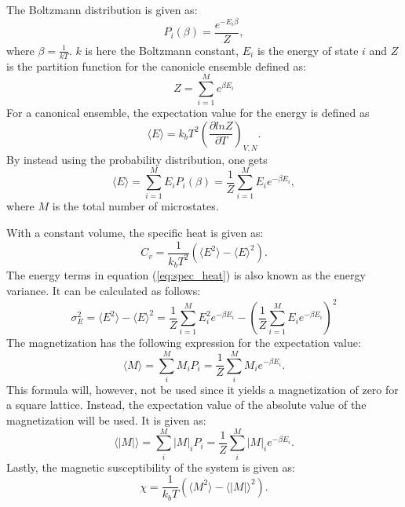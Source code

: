 \documentclass[10pt,a4paper,titlepage]{article}
\begin{document}
The Boltzmann distribution is given as: 
\begin{equation}
P_i(\beta)=\frac{e^{-E_i\beta}}{Z},
\end{equation}
where $\beta = \frac{1}{kT}$. $k$ is here the Boltzmann constant, $E_i$ is the energy of state $i$ and $Z$ is the partition function for the canonicle ensemble defined as:
\begin{equation}
\label{eq:partition}
Z = \sum_{i=1}^{M}e^{\beta E_{i}}
\end{equation}
For a canonical ensemble, the expectation value for the energy is defined as
\begin{equation}
\langle E\rangle=k_{b}T^2\left(\frac{\partial lnZ}{\partial T}\right)_{V,N}.
\end{equation}
By instead using the probability distribution, one gets
\begin{equation}
\langle E\rangle=\sum_{i=1}^{M}E_{i}P_{i}(\beta)=\frac{1}{Z}\sum_{i=1}^{M}E_{i}e^{-\beta E_{i}},
\end{equation}
where $M$ is the total number of microstates. 

With a constant volume, the specific heat is given as:
\begin{equation}
\label{eq:spec_heat}
C_{v}=\frac{1}{k_{b}T^{2}}\left(\langle E^2\rangle - \langle E\rangle^2\right).
\end{equation}
The energy terms in equation (\ref{eq:spec_heat}) is also known as the energy variance. It can be calculated as follows:
\begin{equation}
\label{eq:e_var}
\sigma^2_E = \langle E^2\rangle - \langle E\rangle^2 = \frac{1}{Z}\sum_{i=1}^{M}E_i^2e^{-\beta E_i}-\left(\frac{1}{Z}\sum_{i=1}^{M}E_ie^{-\beta E_i}\right)^{2}
\end{equation}
The magnetization has the following expression for the expectation value:
\begin{equation}
\langle M\rangle = \sum_i^{M}M_{i}P_{i}=\frac{1}{Z}\sum_i^{M}M_{i}e^{-\beta E_i}.
\end{equation}
This formula will, however, not be used since it yields a magnetization of zero for a square lattice. Instead, the expectation value of the absolute value of the magnetization will be used. It is given as:
\begin{equation}
\label{eq:magn}
\langle |M|\rangle = \sum_i^{M}|M|_{i}P_{i}=\frac{1}{Z}\sum_i^{M}|M|_{i}e^{-\beta E_i}.
\end{equation}
Lastly, the magnetic susceptibility of the system is given as:
\begin{equation}
\chi = \frac{1}{k_{b}T}\left(\langle M^2\rangle-\langle|M|\rangle^2\right).
\end{equation}
\end{document}
